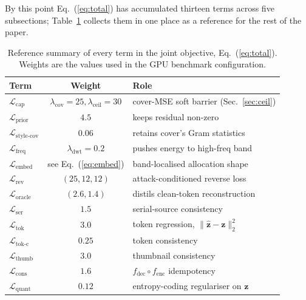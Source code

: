 \documentclass[conference]{IEEEtran}
\begin{document}
By this point Eq.~(\ref{eq:total}) has accumulated thirteen terms across five subsections; Table~\ref{tab:losscheat} collects them in one place as a reference for the rest of the paper.

\begin{table}[t]
\centering
\caption{Reference summary of every term in the joint objective, Eq.~(\ref{eq:total}). Weights are the values used in the GPU benchmark configuration.}
\label{tab:losscheat}
\setlength{\tabcolsep}{3pt}
\small
\begin{tabular}{lcl}
\toprule
\textbf{Term} & \textbf{Weight} & \textbf{Role} \\
\midrule
$\mathcal{L}_{\text{cap}}$ & $\lambda_{\text{cov}}\!=\!25,\lambda_{\text{ceil}}\!=\!30$ & cover-MSE soft barrier (Sec.~\ref{sec:ceil}) \\
\rowcolor{rowshade}
$\mathcal{L}_{\text{prior}}$ & $4.5$ & keeps residual non-zero \\
$\mathcal{L}_{\text{style-cov}}$ & $0.06$ & retains cover's Gram statistics \\
\rowcolor{rowshade}
$\mathcal{L}_{\text{freq}}$ & $\lambda_{\text{dwt}}\!=\!0.2$ & pushes energy to high-freq band \\
$\mathcal{L}_{\text{embed}}$ & see Eq.~(\ref{eq:embed}) & band-localised allocation shape \\
\rowcolor{rowshade}
$\mathcal{L}_{\text{rev}}$ & $(25,12,12)$ & attack-conditioned reverse loss \\
$\mathcal{L}_{\text{oracle}}$ & $(2.6, 1.4)$ & distils clean-token reconstruction \\
\rowcolor{rowshade}
$\mathcal{L}_{\text{ser}}$ & $1.5$ & serial-source consistency \\
$\mathcal{L}_{\text{tok}}$ & $3.0$ & token regression, $\|\hat{\mathbf{z}}-\mathbf{z}\|_2^2$ \\
\rowcolor{rowshade}
$\mathcal{L}_{\text{tok-c}}$ & $0.25$ & token consistency \\
$\mathcal{L}_{\text{thumb}}$ & $3.0$ & thumbnail consistency \\
\rowcolor{rowshade}
$\mathcal{L}_{\text{cons}}$ & $1.6$ & $f_{\text{dec}}\!\circ\!f_{\text{enc}}$ idempotency \\
$\mathcal{L}_{\text{quant}}$ & $0.12$ & entropy-coding regulariser on $\mathbf{z}$ \\
\bottomrule
\end{tabular}
\end{table}
\end{document}
